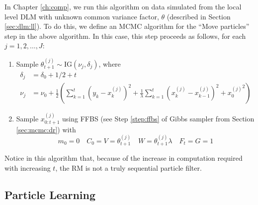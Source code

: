 In Chapter \ref{ch:comp}, we run this algorithm on data simulated from the local level DLM with unknown common variance factor, $\theta$ (described in Section \ref{sec:dlm:ll}). To do this, we define an MCMC algorithm for the ``Move particles'' step in the above algorithm. In this case, this step proceeds as follows, for each $j = 1,2,\ldots,J$:
\begin{enumerate}
\item \label{step:move:ll} Sample $\theta^{(j)}_{t+1} \sim \mbox{IG}(\nu_j, \delta_j)$, where
\begin{align*}
\delta_j &= \delta_0 + 1/2 + t \\
\nu_j &= \nu_0 + \frac{1}{2}\left(\sum_{k=1}^t (y_k - x_k^{(j)})^2 + \frac{1}{\lambda}\sum_{k=1}^t (x_k^{(j)} - x_{k-1}^{(j)})^2 + {x^{(j)}_0}^2\right)
\end{align*}
\item Sample $x_{0:t+1}^{(j)}$ using FFBS (see Step \ref{step:ffbs} of Gibbs sampler from Section \ref{sec:mcmc:dr}) with
\[m_0 = 0 \quad C_0 = V = \theta^{(j)}_{t+1} \quad W = \theta_{t+1}^{(j)}\lambda \quad F_t = G = 1\]
\end{enumerate}
Notice in this algorithm that, because of the increase in computation required with increasing $t$, the RM is not a truly sequential particle filter.

\subsection{Particle Learning \label{sec:pl}}

